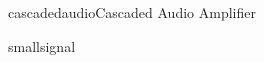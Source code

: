 \begin{mainquestion}{cascadedaudio}{Cascaded Audio Amplifier}
\begin{partquestion}{smallsignal}
\qnewpage

            
            
            
            
        
        

\end{partquestion}
\end{mainquestion}
